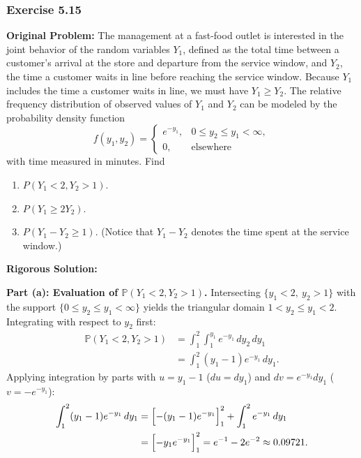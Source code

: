 \documentclass[11pt, letterpaper]{article}
\theoremstyle{definition}
\theoremstyle{remark}
\begin{document}
\bigskip

\subsubsection*{Exercise 5.15}
\textbf{Original Problem:} The management at a fast-food outlet is interested in the joint behavior of the random variables $Y_1$, defined as the total time between a customer's arrival at the store and departure from the service window, and $Y_2$, the time a customer waits in line before reaching the service window. Because $Y_1$ includes the time a customer waits in line, we must have $Y_1 \ge Y_2$. The relative frequency distribution of observed values of $Y_1$ and $Y_2$ can be modeled by the probability density function
\[
    f(y_1, y_2) = \begin{cases}
        e^{-y_1}, & 0 \le y_2 \le y_1 < \infty, \\
        0, & \text{elsewhere}
    \end{cases}
\]
with time measured in minutes. Find
\begin{enumerate}[label=\textbf{\alph*}]
    \item $P(Y_1 < 2, Y_2 > 1)$.
    \item $P(Y_1 \ge 2Y_2)$.
    \item $P(Y_1 - Y_2 \ge 1)$. (Notice that $Y_1 - Y_2$ denotes the time spent at the service window.)
\end{enumerate}

\textbf{Rigorous Solution:}

\textbf{Part (a): Evaluation of $\mathbb{P}(Y_1 < 2, Y_2 > 1)$.}
Intersecting $\{y_1 < 2,\ y_2 > 1\}$ with the support $\{0 \le y_2 \le y_1 < \infty\}$ yields the triangular domain $1 < y_2 \le y_1 < 2$. Integrating with respect to $y_2$ first:
\begin{align*}
    \mathbb{P}(Y_1 < 2, Y_2 > 1) &= \int_{1}^{2} \int_{1}^{y_1} e^{-y_1} \, dy_2 \, dy_1 \\
    &= \int_{1}^{2} (y_1 - 1) e^{-y_1} \, dy_1.
\end{align*}
Applying integration by parts with $u = y_1 - 1$ ($du = dy_1$) and $dv = e^{-y_1} dy_1$ ($v = -e^{-y_1}$):
\begin{align*}
    \int_{1}^{2} (y_1 - 1) e^{-y_1} \, dy_1 &= \Bigl[ -(y_1 - 1) e^{-y_1} \Bigr]_{1}^{2} + \int_{1}^{2} e^{-y_1} \, dy_1 \\
    &= \Bigl[ -y_1 e^{-y_1} \Bigr]_{1}^{2} = e^{-1} - 2e^{-2} \approx 0.09721.
\end{align*}
\end{document}
